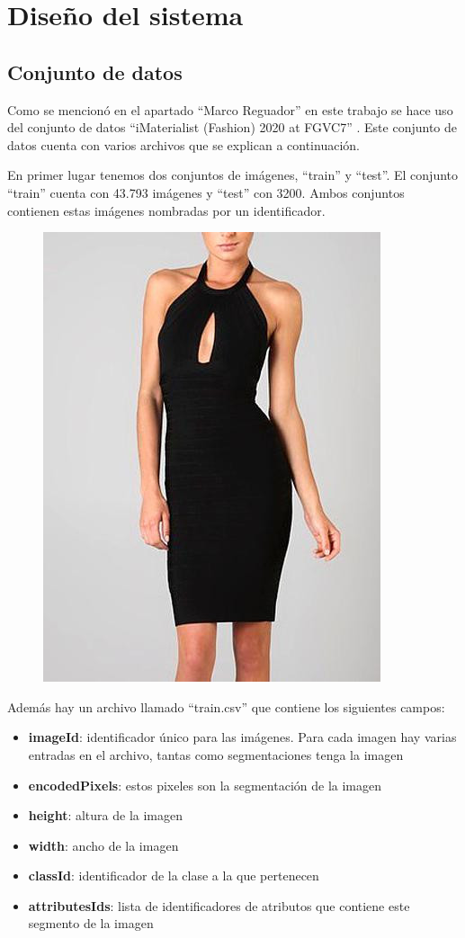 \documentclass[12pt]{report} %
\begin{document}
	\chapter{Diseño del sistema}
	\section{Conjunto de datos}
	Como se mencionó en el apartado ``Marco Reguador'' en este trabajo se hace uso del conjunto de datos 
	``iMaterialist (Fashion) 2020 at FGVC7'' \cite{imaterialist}. Este conjunto de datos cuenta con varios archivos que se 
	explican a continuación.

	En primer lugar tenemos dos conjuntos de imágenes, ``train'' y ``test''. El conjunto ``train'' cuenta con 43.793 imágenes
	y ``test'' con 3200. Ambos conjuntos contienen estas imágenes nombradas por un identificador.
	\begin{figure}[H]
		{\includegraphics[scale=0.4]{ejemplo-dataset.jpg}}
	\end{figure}

	Además hay un archivo llamado ``train.csv'' que contiene los siguientes campos:
	\begin{itemize}
		\item \textbf{imageId}: identificador único para las imágenes. Para cada imagen hay varias entradas en el archivo, tantas como segmentaciones
		tenga la imagen
		\item \textbf{encodedPixels}: estos pixeles son la segmentación de la imagen
		\item \textbf{height}: altura de la imagen
		\item \textbf{width}: ancho de la imagen
		\item \textbf{classId}: identificador de la clase a la que pertenecen
		\item \textbf{attributesIds}: lista de identificadores de atributos que contiene este segmento de la imagen 
	\end{itemize}
\end{document}
